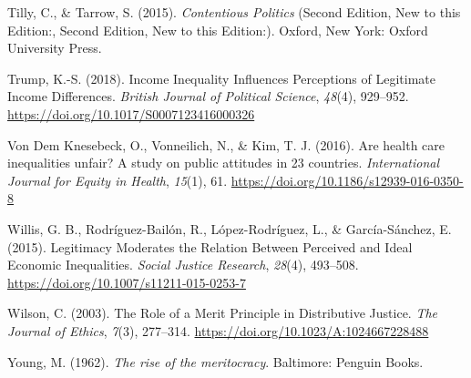 \documentclass[
  12pt,
]{article}
\newlength{\cslhangindent}
\newenvironment{CSLReferences}[2] %
 {\begin{list}{}{%
  \setlength{\itemindent}{0pt}
  \setlength{\leftmargin}{0pt}
  \setlength{\parsep}{0pt}
  \ifodd #1
   \setlength{\leftmargin}{\cslhangindent}
   \setlength{\itemindent}{-1\cslhangindent}
  \fi
  \setlength{\itemsep}{#2\baselineskip}}}
 {\end{list}}
\begin{document}
\begin{CSLReferences}{1}{0}
Tilly, C., \& Tarrow, S. (2015). \emph{Contentious {Politics}} (Second
Edition, New to this Edition:, Second Edition, New to this Edition:).
Oxford, New York: Oxford University Press.

Trump, K.-S. (2018). Income {Inequality Influences Perceptions} of
{Legitimate Income Differences}. \emph{British Journal of Political
Science}, \emph{48}(4), 929--952.
\url{https://doi.org/10.1017/S0007123416000326}

Von Dem Knesebeck, O., Vonneilich, N., \& Kim, T. J. (2016). Are health
care inequalities unfair? {A} study on public attitudes in 23 countries.
\emph{International Journal for Equity in Health}, \emph{15}(1), 61.
\url{https://doi.org/10.1186/s12939-016-0350-8}

Willis, G. B., Rodríguez-Bailón, R., López-Rodríguez, L., \&
García-Sánchez, E. (2015). Legitimacy {Moderates} the {Relation Between
Perceived} and {Ideal Economic Inequalities}. \emph{Social Justice
Research}, \emph{28}(4), 493--508.
\url{https://doi.org/10.1007/s11211-015-0253-7}

Wilson, C. (2003). The {Role} of a {Merit Principle} in {Distributive
Justice}. \emph{The Journal of Ethics}, \emph{7}(3), 277--314.
\url{https://doi.org/10.1023/A:1024667228488}

Young, M. (1962). \emph{The rise of the meritocracy}. Baltimore: Penguin
Books.

\end{CSLReferences}
\end{document}
